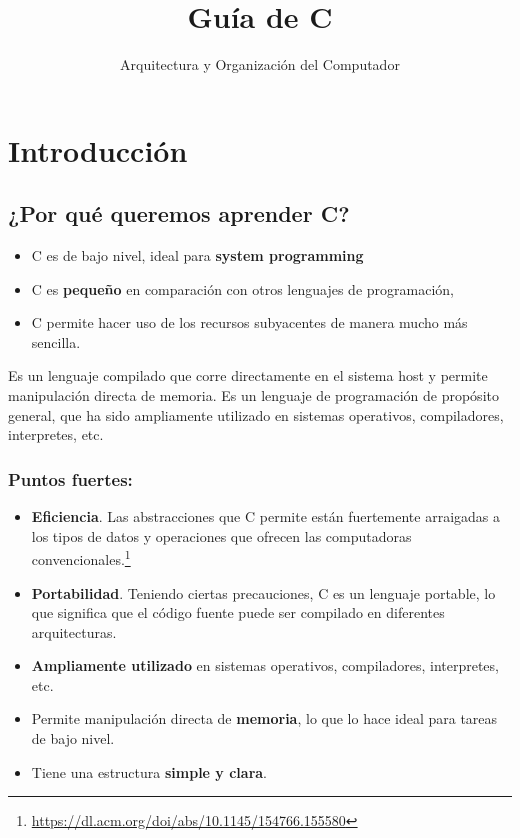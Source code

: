 \documentclass[]{scrartcl}
\title{Guía de C}
\subtitle{Arquitectura y Organización del Computador}
\date{}
\begin{document}
\maketitle

\section*{Introducción}
\subsection*{¿Por qué queremos aprender C?}

\begin{itemize}
  \item C es de bajo nivel, ideal para \textbf{system programming}
  \item C es \textbf{pequeño} en comparación con otros lenguajes de programación, 
  \item C permite hacer uso de los recursos subyacentes de manera mucho más sencilla.
\end{itemize}

Es un lenguaje compilado que corre directamente en el sistema host y permite manipulación directa de memoria. 
Es un lenguaje de programación de propósito general, que ha sido ampliamente utilizado en sistemas operativos, compiladores, interpretes, etc.

\subsubsection*{Puntos fuertes:}
\begin{itemize}
  \item \textbf{Eficiencia}. Las abstracciones que C permite están fuertemente arraigadas a los tipos de datos y operaciones que ofrecen las computadoras convencionales.\footnote{\url{https://dl.acm.org/doi/abs/10.1145/154766.155580}}
  \item \textbf{Portabilidad}. Teniendo ciertas precauciones, C es un lenguaje portable, lo que significa que el código fuente puede ser compilado en diferentes arquitecturas.
  \item \textbf{Ampliamente utilizado} en sistemas operativos, compiladores, interpretes, etc.
  \item Permite manipulación directa de \textbf{memoria}, lo que lo hace ideal para tareas de bajo nivel.
  \item Tiene una estructura \textbf{simple y clara}. 
\end{itemize}
\end{document}
